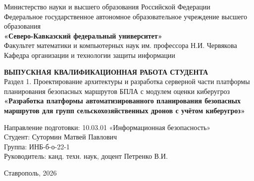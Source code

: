 \documentclass[14pt,a4paper]{extarticle}
\begin{document}
\begin{titlepage}
\begin{center}
Министерство науки и высшего образования Российской Федерации\\
Федеральное государственное автономное образовательное учреждение высшего образования\\
\textbf{«Северо-Кавказский федеральный университет»}\\[0.5cm]
Факультет математики и компьютерных наук им. профессора Н.И. Червякова\\
Кафедра организации и технологии защиты информации
\end{center}

\vfill

\begin{center}
\textbf{ВЫПУСКНАЯ КВАЛИФИКАЦИОННАЯ РАБОТА СТУДЕНТА}\\[0.4cm]
Раздел 1. Проектирование архитектуры и разработка серверной части платформы планирования безопасных маршрутов БПЛА с модулем оценки киберугроз\\[0.8cm]
\textbf{«Разработка платформы автоматизированного планирования безопасных маршрутов для групп сельскохозяйственных дронов с учётом киберугроз»}
\end{center}

\vfill

\begin{flushright}
Направление подготовки: 10.03.01 «Информационная безопасность»\\
Студент: Сутормин Матвей Павлович\\
Группа: ИНБ-б-о-22-1\\[0.4cm]
Руководитель: канд. техн. наук, доцент Петренко В.И.
\end{flushright}

\vfill

\begin{center}
Ставрополь, 2026
\end{center}
\end{titlepage}


\clearpage

\tableofcontents
\clearpage



\clearpage

\end{document}
